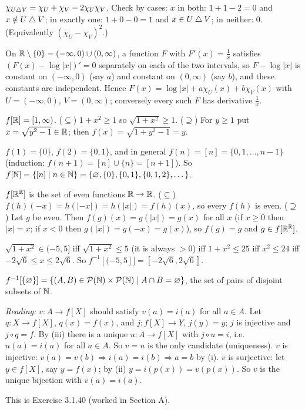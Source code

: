  $\chi_{U\mathbin{\triangle} V}=\chi_U+\chi_V-2\chi_U\chi_V$. Check by cases: $x$ in both: $1+1-2=0$ and $x\notin U\mathbin{\triangle} V$; in exactly one: $1+0-0=1$ and $x\in U\mathbin{\triangle} V$; in neither: $0$. (Equivalently $(\chi_U-\chi_V)^2$.)

 On $\mathbb{R}\setminus\{0\}=(-\infty,0)\cup(0,\infty)$, a function $F$ with $F'(x)=\frac1x$ satisfies $(F(x)-\log|x|)'=0$ separately on each of the two intervals, so $F-\log|x|$ is constant on $(-\infty,0)$ (say $a$) and constant on $(0,\infty)$ (say $b$), and these constants are independent. Hence $F(x)=\log|x|+a\chi_U(x)+b\chi_V(x)$ with $U=(-\infty,0)$, $V=(0,\infty)$; conversely every such $F$ has derivative $\frac1x$.

 $f[\mathbb{R}]=[1,\infty)$. ($\subseteq$) $1+x^2\ge1$ so $\sqrt{1+x^2}\ge1$. ($\supseteq$) For $y\ge1$ put $x=\sqrt{y^2-1}\in\mathbb{R}$; then $f(x)=\sqrt{1+y^2-1}=y$.

 $f(1)=\{0\}$, $f(2)=\{0,1\}$, and in general $f(n)=[n]=\{0,1,\dots,n-1\}$ (induction: $f(n+1)=[n]\cup\{n\}=[n+1]$). So $f[\mathbb{N}]=\{[n]\mid n\in\mathbb{N}\}=\{\varnothing,\{0\},\{0,1\},\{0,1,2\},\dots\}$.

 $f[\mathbb{R}^{\mathbb{R}}]$ is the set of even functions $\mathbb{R}\to\mathbb{R}$. ($\subseteq$) $f(h)(-x)=h(|-x|)=h(|x|)=f(h)(x)$, so every $f(h)$ is even. ($\supseteq$) Let $g$ be even. Then $f(g)(x)=g(|x|)=g(x)$ for all $x$ (if $x\ge0$ then $|x|=x$; if $x<0$ then $g(|x|)=g(-x)=g(x)$), so $f(g)=g$ and $g\in f[\mathbb{R}^{\mathbb{R}}]$.

 $\sqrt{1+x^2}\in(-5,5]$ iff $\sqrt{1+x^2}\le5$ (it is always $>0$) iff $1+x^2\le25$ iff $x^2\le24$ iff $-2\sqrt6\le x\le2\sqrt6$. So $f^{-1}[(-5,5]]=[-2\sqrt6,2\sqrt6]$.

 $f^{-1}[\{\varnothing\}]=\{(A,B)\in\mathcal{P}(\mathbb{N})\times\mathcal{P}(\mathbb{N})\mid A\cap B=\varnothing\}$, the set of pairs of disjoint subsets of $\mathbb{N}$.

 \emph{Reading:} $v:A\to f[X]$ should satisfy $v(a)=i(a)$ for all $a\in A$. Let $q:X\to f[X]$, $q(x)=f(x)$, and $j:f[X]\to Y$, $j(y)=y$; $j$ is injective and $j\circ q=f$. By (iii) there is a unique $u:A\to f[X]$ with $j\circ u=i$, i.e.\ $u(a)=i(a)$ for all $a\in A$. So $v=u$ is the only candidate (uniqueness). $v$ is injective: $v(a)=v(b)\Rightarrow i(a)=i(b)\Rightarrow a=b$ by (i). $v$ is surjective: let $y\in f[X]$, say $y=f(x)$; by (ii) $y=i(p(x))=v(p(x))$. So $v$ is the unique bijection with $v(a)=i(a)$.

 This is Exercise 3.1.40 (worked in Section A).

